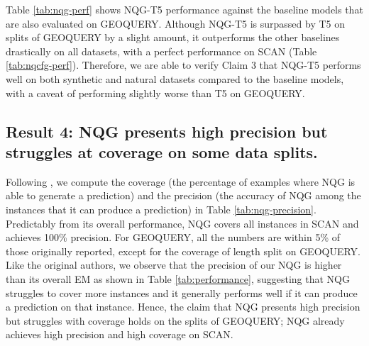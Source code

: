 Table \ref{tab:nqg-perf} shows NQG-T5 performance against the baseline models that are also evaluated on GEOQUERY.
Although NQG-T5 is surpassed by T5 on splits of GEOQUERY by a slight amount, it outperforms the other baselines drastically on all datasets, with a perfect performance on SCAN (Table \ref{tab:nqcfg-perf}).
Therefore, we are able to verify Claim 3 that NQG-T5 performs well on both synthetic and natural datasets compared to the baseline models, with a caveat of performing slightly worse than T5 on GEOQUERY.
\subsection{Result 4: NQG presents high precision but struggles at coverage on some data splits.}

\label{sec:coverage}

Following \citet{shaw-etal-2021-compositional}, we compute the coverage (the percentage of examples where NQG is able to generate a prediction) and the precision (the accuracy of NQG among the instances that it can produce a prediction) in Table \ref{tab:nqg-precision}.
Predictably from its overall performance, NQG covers all instances in SCAN and achieves 100\% precision.
For GEOQUERY, all the numbers are within 5\% of those originally reported, except for the coverage of length split on GEOQUERY. 
Like the original authors, we observe that the precision of our NQG is higher than its overall EM as shown in Table \ref{tab:performance}, suggesting that NQG struggles to cover more instances and it generally performs well if it can produce a prediction on that instance.
Hence, the claim that NQG presents high precision but struggles with coverage holds on the splits of GEOQUERY; NQG already achieves high precision and high coverage on SCAN.

